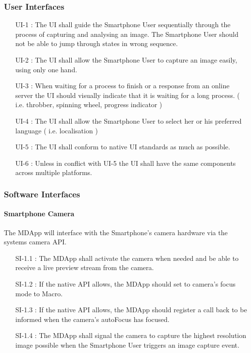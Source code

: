 \subsubsection{User Interfaces}

        \begin{itemize}[leftmargin=1.4cm]
            \item[UI-1 :] The UI shall guide the Smartphone User sequentially through the process of capturing and analysing an image. The Smartphone User should not be able to jump through states in wrong sequence.
            \item[UI-2 :] The UI shall allow the Smartphone User to capture an image easily, using only one hand.
            \item[UI-3 :] When waiting for a process to finish or a response from an online server the UI should visually indicate that it is waiting for a long process. ( i.e. throbber, spinning wheel, progress indicator )
            \item[UI-4 :] The UI shall allow the Smartphone User to select her or his preferred language ( i.e. localisation )
            \item[UI-5 :] The UI shall conform to native UI standards as much as possible.
            \item[UI-6 :] Unless in conflict with UI-5 the UI shall have the same components across multiple platforms.

        \end{itemize}

\subsubsection{Software Interfaces}

    \paragraph{Smartphone Camera }

        The MDApp will interface with the Smartphone's camera hardware via the systems camera API.

        \begin{itemize}[leftmargin=1.4cm]
            \item[SI-1.1 :] The MDApp shall activate the camera when needed and be able to receive a live preview stream from the camera.
            \item[SI-1.2 :] If the native API allows, the MDApp should set to camera’s focus mode to Macro.
            \item[SI-1.3 :] If the native API allows, the MDApp should register a call back to be informed when the camera’s autoFocus has focused.
            \item[SI-1.4 :] The MDApp shall signal the camera to capture the highest resolution image possible when the Smartphone User triggers an image capture event.

        \end{itemize}

